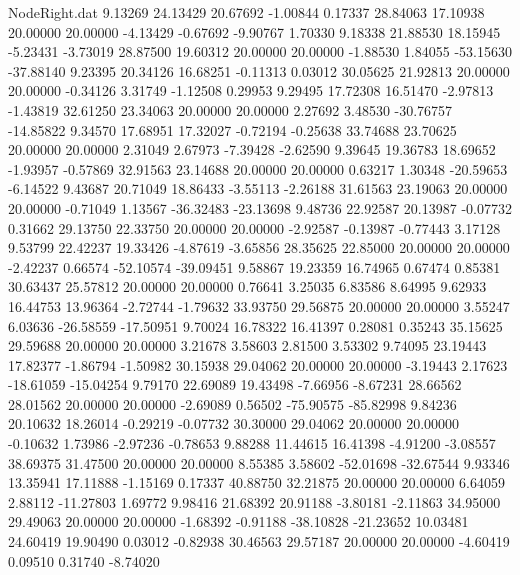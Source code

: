 \begin{filecontents}{NodeRight.dat}
   9.13269   24.13429   20.67692    -1.00844    0.17337   28.84063   17.10938   20.00000   20.00000   -4.13429   -0.67692   -9.90767    1.70330
   9.18338   21.88530   18.15945    -5.23431   -3.73019   28.87500   19.60312   20.00000   20.00000   -1.88530    1.84055  -53.15630  -37.88140
   9.23395   20.34126   16.68251    -0.11313    0.03012   30.05625   21.92813   20.00000   20.00000   -0.34126    3.31749   -1.12508    0.29953
   9.29495   17.72308   16.51470    -2.97813   -1.43819   32.61250   23.34063   20.00000   20.00000    2.27692    3.48530  -30.76757  -14.85822
   9.34570   17.68951   17.32027    -0.72194   -0.25638   33.74688   23.70625   20.00000   20.00000    2.31049    2.67973   -7.39428   -2.62590
   9.39645   19.36783   18.69652    -1.93957   -0.57869   32.91563   23.14688   20.00000   20.00000    0.63217    1.30348  -20.59653   -6.14522
   9.43687   20.71049   18.86433    -3.55113   -2.26188   31.61563   23.19063   20.00000   20.00000   -0.71049    1.13567  -36.32483  -23.13698
   9.48736   22.92587   20.13987    -0.07732    0.31662   29.13750   22.33750   20.00000   20.00000   -2.92587   -0.13987   -0.77443    3.17128
   9.53799   22.42237   19.33426    -4.87619   -3.65856   28.35625   22.85000   20.00000   20.00000   -2.42237    0.66574  -52.10574  -39.09451
   9.58867   19.23359   16.74965     0.67474    0.85381   30.63437   25.57812   20.00000   20.00000    0.76641    3.25035    6.83586    8.64995
   9.62933   16.44753   13.96364    -2.72744   -1.79632   33.93750   29.56875   20.00000   20.00000    3.55247    6.03636  -26.58559  -17.50951
   9.70024   16.78322   16.41397     0.28081    0.35243   35.15625   29.59688   20.00000   20.00000    3.21678    3.58603    2.81500    3.53302
   9.74095   23.19443   17.82377    -1.86794   -1.50982   30.15938   29.04062   20.00000   20.00000   -3.19443    2.17623  -18.61059  -15.04254
   9.79170   22.69089   19.43498    -7.66956   -8.67231   28.66562   28.01562   20.00000   20.00000   -2.69089    0.56502  -75.90575  -85.82998
   9.84236   20.10632   18.26014    -0.29219   -0.07732   30.30000   29.04062   20.00000   20.00000   -0.10632    1.73986   -2.97236   -0.78653
   9.88288   11.44615   16.41398    -4.91200   -3.08557   38.69375   31.47500   20.00000   20.00000    8.55385    3.58602  -52.01698  -32.67544
   9.93346   13.35941   17.11888    -1.15169    0.17337   40.88750   32.21875   20.00000   20.00000    6.64059    2.88112  -11.27803    1.69772
   9.98416   21.68392   20.91188    -3.80181   -2.11863   34.95000   29.49063   20.00000   20.00000   -1.68392   -0.91188  -38.10828  -21.23652
  10.03481   24.60419   19.90490     0.03012   -0.82938   30.46563   29.57187   20.00000   20.00000   -4.60419    0.09510    0.31740   -8.74020

\end{filecontents}
